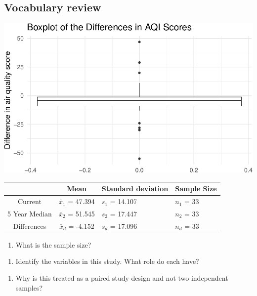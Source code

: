 \documentclass[
]{report}
\providecommand{\tightlist}{%
  \setlength{\itemsep}{0pt}\setlength{\parskip}{0pt}}
\begin{document}
\hypertarget{vocabulary-review}{%
\subsection{Vocabulary review}\label{vocabulary-review}}

\begin{center}\includegraphics[width=0.7\linewidth]{08-paired_files/figure-latex/unnamed-chunk-2-1} \end{center}

\begin{longtable}[]{@{}ccll@{}}
\toprule
& Mean & Standard deviation & Sample Size\tabularnewline
\midrule
\endhead
Current & \(\bar{x}_1\) = 47.394 & \(s_1\) = 14.107 & \(n_1\) = 33\tabularnewline
5 Year Median & \(\bar{x}_2\) = 51.545 & \(s_2\) = 17.447 & \(n_2\) = 33\tabularnewline
Differences & \(\bar{x}_d\) = -4.152 & \(s_d\) = 17.096 & \(n_d\) = 33\tabularnewline
\bottomrule
\end{longtable}

\begin{enumerate}
\def\labelenumi{\arabic{enumi}.}
\tightlist
\item
  What is the sample size?
\end{enumerate}

\vspace{0.5in}

\begin{enumerate}
\def\labelenumi{\arabic{enumi}.}
\setcounter{enumi}{1}
\tightlist
\item
  Identify the variables in this study. What role do each have?
\end{enumerate}

\vspace{1in}

\begin{enumerate}
\def\labelenumi{\arabic{enumi}.}
\setcounter{enumi}{2}
\tightlist
\item
  Why is this treated as a paired study design and not two independent samples?
\end{enumerate}
\end{document}
